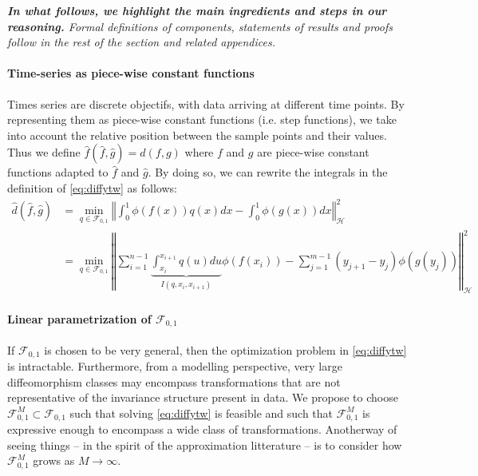 \emph{\textbf{In what follows, we highlight the main ingredients and steps in our reasoning.} Formal definitions of components, statements of results and proofs follow in the rest of the section and related appendices.}

\paragraph{Time-series as piece-wise constant functions} Times series are discrete objectifs, with data arriving at different time points. By representing them as piece-wise constant functions (i.e. step functions), we take into account the relative position between the sample points and their values. %
Thus we define $\hat f(\hat f, \hat g) =d(f, g)$ where $f$ and $g$ are piece-wise constant functions adapted to $\hat f$ and $\hat g$. By doing so, we can rewrite the integrals in the definition of \cref{eq:diffytw} as follows:
\begin{align}
    \hat d(\hat f, \hat g) &= \min_{q \in \mathcal F_{0,1}}\left\Vert \int_0^1 \phi(f(x))q(x)dx - \int_0^1\phi(g(x))dx\right\Vert^2_\mathcal H\label{eq:diffytw-step-1}\\
            &\label{eq:diffytw-step-2}= \min_{q\in\mathcal F_{0,1}} \left \Vert \sum_{i=1}^{n-1} \underbrace{\int_{x_i}^{x_{i+1}}q(u)du}_{I(q, x_i, x_{i+1})} \phi(f(x_i)) - \sum_{j=1}^{m-1} (y_{j+1} - y_j)\phi(g(y_j))\right\Vert_\mathcal H^2
\end{align}

\paragraph{Linear parametrization of $\mathcal F_{0,1}$} If $\mathcal F_{0,1}$ is chosen to be very general, then the optimization problem in \cref{eq:diffytw} is intractable. Furthermore, from a modelling perspective, very large diffeomorphism classes may encompass transformations that are not representative of the invariance structure present in data. We propose to choose $\mathcal F_{0,1}^M\subset \mathcal F_{0,1}$ such that solving \cref{eq:diffytw} is feasible and such that $\mathcal F_{0,1}^M$ is expressive enough to encompass a wide class of transformations. Anotherway of seeing things -- in the spirit of the approximation litterature -- is to consider how $\mathcal F_{0, 1}^M$ grows as $M \to \infty$.

